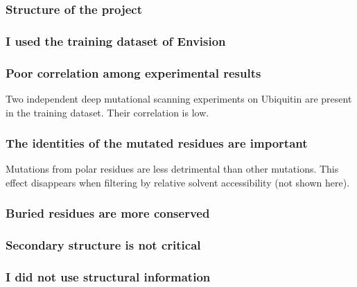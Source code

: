 \documentclass[10pt, british]{beamer}
\begin{document}
\begin{frame}
	\frametitle{Structure of the project}
	\begin{figure}
		
	\end{figure}
\end{frame}

\begin{frame}
	\frametitle{I used the training dataset of Envision \parencite{Gray2018}}
	\vfill%
	\centering%
	
	
\end{frame}

\begin{frame}
	\frametitle{Poor correlation among experimental results}
	Two independent deep mutational scanning experiments on Ubiquitin are present in the training dataset.
	Their correlation is low.
	\vfill%
	\centering%
	
\end{frame}

\begin{frame}
	\frametitle{The identities of the mutated residues are important}
	Mutations from polar residues are less detrimental than other mutations.
	This effect disappears when filtering by relative solvent accessibility (not shown here).
	\vfill%
	\centering%
	
\end{frame}

\begin{frame}
	\frametitle{Buried residues are more conserved}
	\centering%
	
\end{frame}

\begin{frame}
	\frametitle{Secondary structure is not critical}
	\centering%
	
\end{frame}

\begin{frame}
	\frametitle{I did not use structural information}
	\begin{figure}
		
	\end{figure}
\end{frame}
\end{document}
